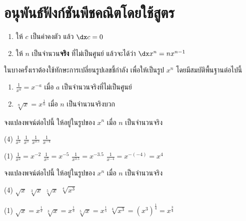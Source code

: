 \section[สูตร]{อนุพันธ์ฟังก์ชันพีชคณิตโดยใช้สูตร}
\frame{\sectionpage}

\begin{frame}
\begin{thm}{}{}
\begin{enumerate}
\item ให้ $c$ เป็นค่าคงตัว แล้ว $\dx c = 0$
\item ให้ $n$ เป็นจำนวน\textbf{จริง} ที่ไม่เป็นศูนย์ แล้วจะได้ว่า $\dx x^n = nx^{n-1}$
\end{enumerate}
\end{thm}
ในบางครั้งเราต้องใช้ทักษะการเปลี่ยนรูปเลขชี้กำลัง เพื่อให้เป็นรูป $x^n$ โดยมีสมบัติพื้นฐานต่อไปนี้
\begin{prop}{}{}
\begin{enumerate}
\item $\frac{1}{x^a} = x^{-a} $ เมื่อ $a$ เป็นจำนวนจริงที่ไม่เป็นศูนย์
\item $\sqrt[n]{x} = x^{\frac{1}{n}}$ เมื่อ $n$ เป็นจำนวนจริงบวก
\end{enumerate}
\end{prop}
\end{frame}

\begin{frame}[t]
\begin{ex}
จงแปลงพจน์ต่อไปนี้ ให้อยู่ในรูปของ $x^n$ เมื่อ $n$ เป็นจำนวนจริง
\begin{tasks}(4)
\task $\frac{1}{x^2}$
\task $\frac{1}{x^5}$
\task $\frac{1}{x^{3.5}}$
\task $\frac{1}{x^{-4}}$
\end{tasks}
\end{ex}
\begin{sol}
\begin{tasks}(1)
\task $\frac{1}{x^2} = x^{-2}$
\task $\frac{1}{x^5} = x^{-5}$
\task $\frac{1}{x^{3.5}} = x^{-3.5}$
\task $\frac{1}{x^{-4}} = x^{-(-4)} = x^4$
\end{tasks}
\end{sol}
\end{frame}

\begin{frame}[t]
\begin{ex}
จงแปลงพจน์ต่อไปนี้ ให้อยู่ในรูปของ $x^n$ เมื่อ $n$ เป็นจำนวนจริง
\begin{tasks}(4)
\task $\sqrt{x}$
\task $\sqrt[3]{x}$
\task $\sqrt[5]{x}$
\task $\sqrt[4]{x^3}$
\end{tasks}
\end{ex}
\begin{sol}
\begin{tasks}(1)
\task $\sqrt{x} = x^{\frac{1}{2}}$
\task $\sqrt[3]{x} = x^{\frac{1}{3}}$
\task $\sqrt[5]{x} = x^{\frac{1}{5}}$
\task $\sqrt[4]{x^3} = (x^3)^{\frac{1}{4}} = x^{\frac{3}{4}}$
\end{tasks}
\end{sol}
\end{frame}

